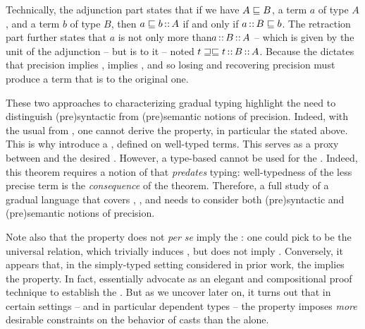 Technically, the adjunction part states that if we have $A \sqsubseteq B$, a term $a$ of type $A$,
and a term $b$ of type $B$, then $a \sqsubseteq b \operatorname{:\hspace{-1.5pt}:} A$ if and only if $a \operatorname{:\hspace{-1.5pt}:} B \sqsubseteq b$.
%
\AP The retraction part further states that $a$ is not only more 
than$a \operatorname{:\hspace{-1.5pt}:} B \operatorname{:\hspace{-1.5pt}:} A$ – which is given by the unit of the adjunction –
but is  to it – noted $t \sqsupseteq\sqsubseteq t \operatorname{:\hspace{-1.5pt}:} B \operatorname{:\hspace{-1.5pt}:} A$.
Because the  dictates that precision implies ,
 implies ,
and so losing and recovering precision must produce a term that is  to the original one.

\AP These two approaches to characterizing gradual typing highlight the need to distinguish
\intro(pre){syntactic} from \intro(pre){semantic} notions of precision.
Indeed, with the usual  from ,
one cannot derive the  property, in particular the  stated above.
This is why  introduce a ,
defined on well-typed terms. This  serves
as a proxy between  and the desired
.
%
However, a type-based  cannot be used for the .
Indeed, this theorem%
requires a notion of  that \emph{predates} typing:
well-typedness of the less precise term is the \emph{consequence} of the theorem. 
Therefore, a full study of a gradual language that covers , , and
 needs to consider both \kl(pre){syntactic} and \kl(pre){semantic}
notions of precision.

Note also that the  property does not
\textit{per se} imply the : one could pick  to be the universal relation,
which trivially induces , but does not imply .
Conversely, it appears that, in the simply-typed setting considered in prior work,
the  implies the  property.
In fact, \textcite{New2018} essentially advocate  as an elegant and compositional
proof technique to establish the .
But as we uncover later on, it turns out that in certain settings – and in particular dependent types – the  property imposes \emph{more}
desirable constraints on the behavior of casts than the  alone.

